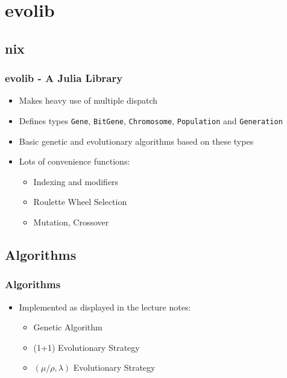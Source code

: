 \documentclass[%
14pt
]{beamer}
\begin{document}
\section{evolib}
\subsection{nix}
\begin{frame}
  \frametitle{evolib - A Julia Library}
  \begin{itemize}
    \item Makes heavy use of multiple dispatch
    \item Defines types \texttt{Gene}, \texttt{BitGene}, \texttt{Chromosome}, \texttt{Population} and \texttt{Generation}
    \item Basic genetic and evolutionary algorithms based on these types
    \item Lots of convenience functions:
      \begin{itemize}
        \item Indexing and modifiers
        \item Roulette Wheel Selection
        \item Mutation, Crossover
      \end{itemize}
  \end{itemize}
\end{frame}

\subsection{Algorithms}
\begin{frame}
  \frametitle{Algorithms}
  \begin{spacing}{1.5}
    \begin{itemize}
      \item Implemented as displayed in the lecture notes:
        \begin{itemize}
          \item Genetic Algorithm
          \item (1+1) Evolutionary Strategy
          \item $(\mu/\rho, \lambda)$ Evolutionary Strategy
        \end{itemize}
    \end{itemize}
  \end{spacing}
\end{frame}
\end{document}

